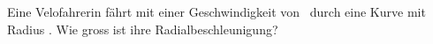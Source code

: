 Eine Velofahrerin fährt mit einer Geschwindigkeit von \vvO\ durch eine Kurve mit Radius \rkO. Wie gross ist ihre Radialbeschleunigung?
